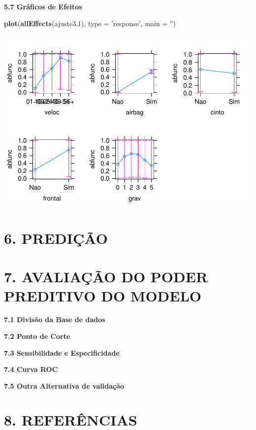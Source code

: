 \documentclass[]{article}
\newenvironment{Shaded}{\begin{snugshade}}{\end{snugshade}}
\newcommand{\KeywordTok}[1]{\textcolor[rgb]{0.13,0.29,0.53}{\textbf{{#1}}}}
\newcommand{\DataTypeTok}[1]{\textcolor[rgb]{0.13,0.29,0.53}{{#1}}}
\newcommand{\FloatTok}[1]{\textcolor[rgb]{0.00,0.00,0.81}{{#1}}}
\newcommand{\StringTok}[1]{\textcolor[rgb]{0.31,0.60,0.02}{{#1}}}
\newcommand{\NormalTok}[1]{{#1}}
\begin{document}
\textbf{5.7 Gráficos de Efeitos}

\begin{Shaded}
\begin{Highlighting}[]
\KeywordTok{plot}\NormalTok{(}\KeywordTok{allEffects}\NormalTok{(ajuste3}\FloatTok{.1}\NormalTok{), }\DataTypeTok{type =} \StringTok{'response'}\NormalTok{, }\DataTypeTok{main =} \StringTok{''}\NormalTok{)}
\end{Highlighting}
\end{Shaded}

\includegraphics{Dados_Binários1_files/figure-latex/unnamed-chunk-20-1.pdf}

\section{6. PREDIÇÃO}\label{predicao}

\section{7. AVALIAÇÃO DO PODER PREDITIVO DO
MODELO}\label{avaliacao-do-poder-preditivo-do-modelo}

\textbf{7.1 Divisão da Base de dados}

\textbf{7.2 Ponto de Corte}

\textbf{7.3 Sensibilidade e Especificidade}

\textbf{7.4 Curva ROC}

\textbf{7.5 Outra Alternativa de validação}

\section{8. REFERÊNCIAS}\label{referencias}

\section{}\label{section}
\end{document}
